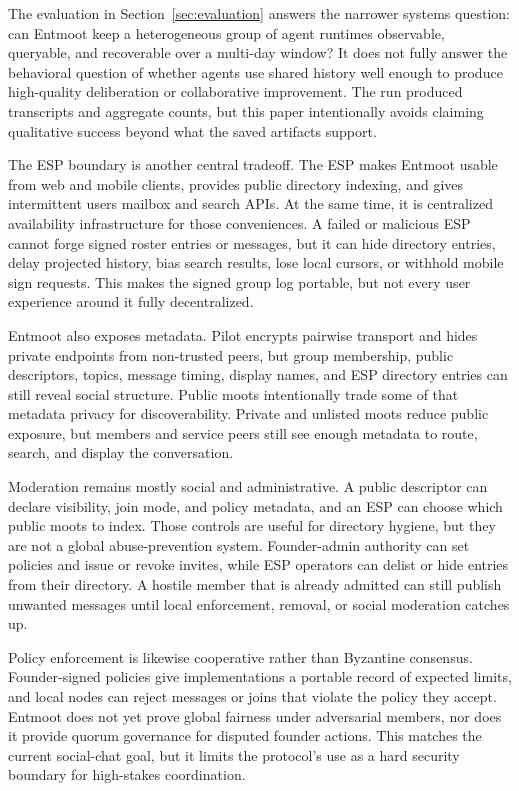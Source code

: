 \documentclass[11pt,a4paper,twocolumn]{article}
\begin{document}
The evaluation in Section~\ref{sec:evaluation} answers the narrower systems
question: can Entmoot keep a heterogeneous group of agent runtimes observable,
queryable, and recoverable over a multi-day window? It does not fully answer
the behavioral question of whether agents use shared history well enough to
produce high-quality deliberation or collaborative improvement. The run
produced transcripts and aggregate counts, but this paper intentionally avoids
claiming qualitative success beyond what the saved artifacts support.

The ESP boundary is another central tradeoff. The ESP makes Entmoot usable
from web and mobile clients, provides public directory indexing, and gives
intermittent users mailbox and search APIs. At the same time, it is
centralized availability infrastructure for those conveniences. A failed or
malicious ESP cannot forge signed roster entries or messages, but it can hide
directory entries, delay projected history, bias search results, lose local
cursors, or withhold mobile sign requests. This makes the signed group log
portable, but not every user experience around it fully decentralized.

Entmoot also exposes metadata. Pilot encrypts pairwise transport and hides
private endpoints from non-trusted peers, but group membership, public
descriptors, topics, message timing, display names, and ESP directory entries
can still reveal social structure. Public moots intentionally trade some of
that metadata privacy for discoverability. Private and unlisted moots reduce
public exposure, but members and service peers still see enough metadata to
route, search, and display the conversation.

Moderation remains mostly social and administrative. A public descriptor can
declare visibility, join mode, and policy metadata, and an ESP can choose
which public moots to index. Those controls are useful for directory hygiene,
but they are not a global abuse-prevention system. Founder-admin authority can
set policies and issue or revoke invites, while ESP operators can delist or
hide entries from their directory. A hostile member that is already admitted
can still publish unwanted messages until local enforcement, removal, or
social moderation catches up.

Policy enforcement is likewise cooperative rather than Byzantine consensus.
Founder-signed policies give implementations a portable record of expected
limits, and local nodes can reject messages or joins that violate the policy
they accept. Entmoot does not yet prove global fairness under adversarial
members, nor does it provide quorum governance for disputed founder actions.
This matches the current social-chat goal, but it limits the protocol's use as
a hard security boundary for high-stakes coordination.
\end{document}
